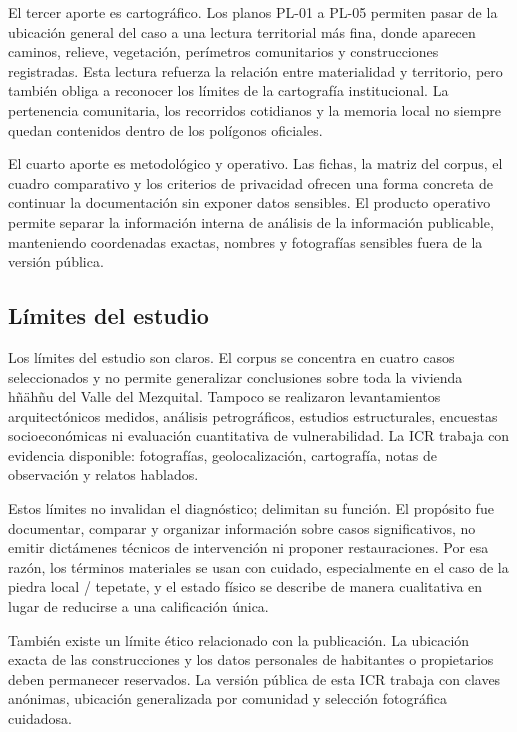 El tercer aporte es cartográfico. Los planos PL-01 a PL-05 permiten pasar de la ubicación general del caso a una lectura territorial más fina, donde aparecen caminos, relieve, vegetación, perímetros comunitarios y construcciones registradas. Esta lectura refuerza la relación entre materialidad y territorio, pero también obliga a reconocer los límites de la cartografía institucional. La pertenencia comunitaria, los recorridos cotidianos y la memoria local no siempre quedan contenidos dentro de los polígonos oficiales.

El cuarto aporte es metodológico y operativo. Las fichas, la matriz del corpus, el cuadro comparativo y los criterios de privacidad ofrecen una forma concreta de continuar la documentación sin exponer datos sensibles. El producto operativo permite separar la información interna de análisis de la información publicable, manteniendo coordenadas exactas, nombres y fotografías sensibles fuera de la versión pública.

\subsection{Límites del estudio}

Los límites del estudio son claros. El corpus se concentra en cuatro casos seleccionados y no permite generalizar conclusiones sobre toda la vivienda hñähñu del Valle del Mezquital. Tampoco se realizaron levantamientos arquitectónicos medidos, análisis petrográficos, estudios estructurales, encuestas socioeconómicas ni evaluación cuantitativa de vulnerabilidad. La ICR trabaja con evidencia disponible: fotografías, geolocalización, cartografía, notas de observación y relatos hablados.

Estos límites no invalidan el diagnóstico; delimitan su función. El propósito fue documentar, comparar y organizar información sobre casos significativos, no emitir dictámenes técnicos de intervención ni proponer restauraciones. Por esa razón, los términos materiales se usan con cuidado, especialmente en el caso de la piedra local / tepetate, y el estado físico se describe de manera cualitativa en lugar de reducirse a una calificación única.

También existe un límite ético relacionado con la publicación. La ubicación exacta de las construcciones y los datos personales de habitantes o propietarios deben permanecer reservados. La versión pública de esta ICR trabaja con claves anónimas, ubicación generalizada por comunidad y selección fotográfica cuidadosa.

